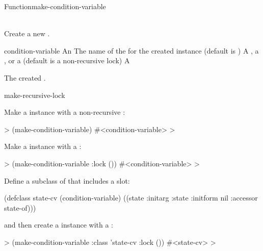 \begin{functiondoc}{Function}{make-condition-variable}%
  {  \\ 
     \\
   \returns{} }
%
%
%
 
\fnsyntax

\fnpurpose Create a new .

\fnpackage {}

\fnmodule {}

\fnargs
\begin{args}{condition-variable}
\arg[initargs] An 
\arg[class] The name of the  for the created
 instance (default is
)
\arg[lock] A , a , or a 
 (default is a non-recursive lock)
 A 
\end{args}

\fnreturns
The created .

\begin{alsos}{make-recursive-lock}
\end{alsos}

\fnexamples
Make a  instance with a non-recursive 
:
%
\W\supp
\begin{example}
  > (make-condition-variable)
  #<condition-variable>
  >
\end{example}
%
Make a  instance with a
:
%
\W\supp\notpretop
\begin{example}
  > (make-condition-variable :lock ())
  #<condition-variable>
  >
\end{example}
%
Define a subclass of  that includes a 
 slot:
%
\W\supp\notpretop
\begin{example}
  (defclass state-cv (condition-variable)
    ((state :initarg :state
            :initform nil
            :accessor state-of)))
\end{example}
%
and then create a  instance with a
:
%
\W\supp\notpretop
\begin{example}
  > (make-condition-variable :class 'state-cv
                             :lock ())
  #<state-cv>
  >
\end{example}


\end{functiondoc}
